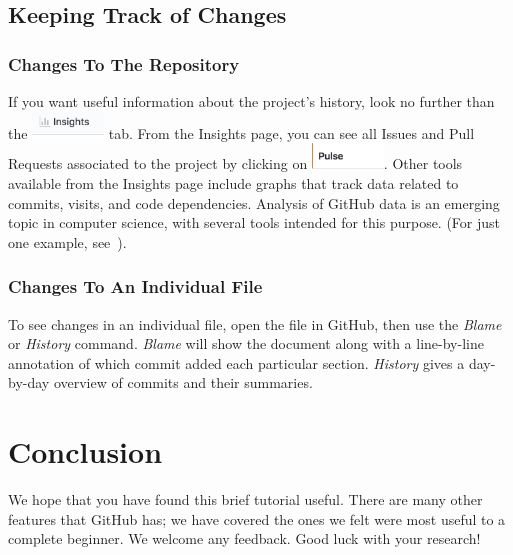 \documentclass[11pt]{article}
\begin{document}
\subsection{Keeping Track of Changes}

\subsubsection{Changes To The Repository} 

If you want useful information about the project's history, look no further than the \includegraphics[width=0.75in]{Insights} tab. From the Insights page, you can see all Issues and Pull Requests associated to the project by clicking on  \includegraphics[width=0.75in]{Pulse}. Other tools available from the Insights page include graphs that track data related to commits, visits, and code dependencies. Analysis of GitHub data is an emerging topic in computer science, with several tools intended for this purpose. (For just one example, see~\cite{github-gender-study}). 

\subsubsection{Changes To An Individual File}

To see changes in an individual file, open the file in GitHub, then use the \textit{Blame} or \textit{History} command. \textit{Blame} will show the document along with a line-by-line annotation of which commit added each particular section. \textit{History} gives a day-by-day overview of commits and their summaries. 

\section{Conclusion}

We hope that you have found this brief tutorial useful. There are many other features that GitHub has; we have covered the ones we felt were most useful to a complete beginner. We welcome any feedback. Good luck with your research!



\end{document}
